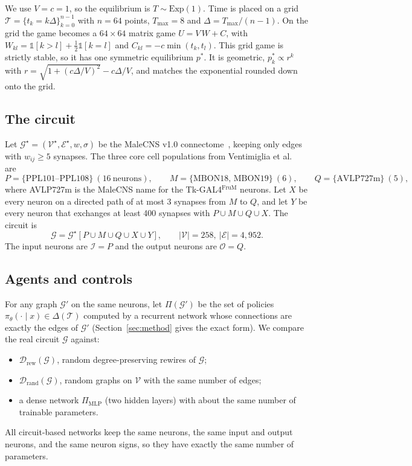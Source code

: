 \documentclass{article}
\newcommand{\T}{\mathcal{T}}
\newcommand{\G}{\mathcal{G}}
\newcommand{\Vset}{\mathcal{V}}
\newcommand{\Eset}{\mathcal{E}}
\newcommand{\In}{\mathcal{I}}
\newcommand{\Out}{\mathcal{O}}
\begin{document}
We use $V = c = 1$, so the equilibrium is $T \sim \mathrm{Exp}(1)$. Time is placed on a grid $\T = \{t_k = k\Delta\}_{k=0}^{n-1}$ with $n = 64$ points, $T_{\max} = 8$ and $\Delta = T_{\max}/(n-1)$. On the grid the game becomes a $64 \times 64$ matrix game $U = V\,W + C$, with $W_{kl} = \mathbb 1[k>l] + \tfrac12 \mathbb 1[k=l]$ and $C_{kl} = -c\min(t_k,t_l)$. This grid game is strictly stable, so it has one symmetric equilibrium $p^*$. It is geometric, $p^*_k \propto r^k$ with $r = \sqrt{1+(c\Delta/V)^2} - c\Delta/V$, and matches the exponential rounded down onto the grid.

\subsection{The circuit}

Let $\G^\star = (\Vset^\star, \Eset^\star, w, \sigma)$ be the MaleCNS v1.0 connectome~\cite{berg2026}, keeping only edges with $w_{ij} \ge 5$ synapses. The three core cell populations from Ventimiglia et al.~\cite{ventimiglia2026} are
\[
P = \{\text{PPL101--PPL108}\}\ (16\ \text{neurons}),\qquad
M = \{\text{MBON18, MBON19}\}\ (6),\qquad
Q = \{\text{AVLP727m}\}\ (5),
\]
where AVLP727m is the MaleCNS name for the Tk-GAL4$^{\mathrm{FruM}}$ neurons. Let $X$ be every neuron on a directed path of at most 3 synapses from $M$ to $Q$, and let $Y$ be every neuron that exchanges at least 400 synapses with $P \cup M \cup Q \cup X$. The circuit is
\[
\G = \G^\star[P \cup M \cup Q \cup X \cup Y], \qquad |\Vset| = 258,\ |\Eset| = 4{,}952.
\]
The input neurons are $\In = P$ and the output neurons are $\Out = Q$.

\subsection{Agents and controls}

For any graph $\G'$ on the same neurons, let $\Pi(\G')$ be the set of policies $\pi_\theta(\cdot \mid x) \in \Delta(\T)$ computed by a recurrent network whose connections are exactly the edges of $\G'$ (Section~\ref{sec:method} gives the exact form). We compare the real circuit $\G$ against:
\begin{itemize}
  \item $\mathcal D_{\mathrm{rew}}(\G)$, random degree-preserving rewires of $\G$;
  \item $\mathcal D_{\mathrm{rand}}(\G)$, random graphs on $\Vset$ with the same number of edges;
  \item a dense network $\Pi_{\mathrm{MLP}}$ (two hidden layers) with about the same number of trainable parameters.
\end{itemize}
All circuit-based networks keep the same neurons, the same input and output neurons, and the same neuron signs, so they have exactly the same number of parameters.
\end{document}
